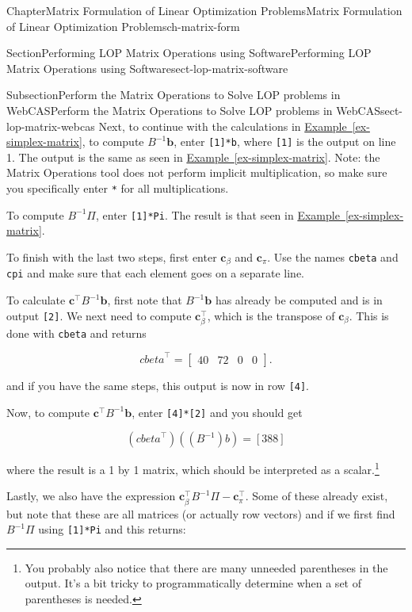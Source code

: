 \documentclass[oneside,10pt,]{book}
\newcommand{\xreffont}{\relax}
\newcommand{\mono}[1]{\texttt{#1}}
\numberwithin{equation}{section}
\newcommand{\amp}{&}
\begin{document}
\begin{chapterptx}{Chapter}{Matrix Formulation of Linear Optimization Problems}{}{Matrix Formulation of Linear Optimization Problems}{}{}{ch-matrix-form}
\begin{sectionptx}{Section}{Performing LOP Matrix Operations using Software}{}{Performing LOP Matrix Operations using Software}{}{}{sect-lop-matrix-software}
\begin{subsectionptx}{Subsection}{Perform the Matrix Operations to Solve LOP problems in WebCAS}{}{Perform the Matrix Operations to Solve LOP problems in WebCAS}{}{}{sect-lop-matrix-webcas}
Next, to continue with the calculations in \hyperref[ex-simplex-matrix]{Example~{\xreffont\ref{ex-simplex-matrix}}}, to compute \(B^{-1}\boldsymbol{b}\), enter \mono{[1]*b}, where \mono{[1]} is the output on line 1. The output is the same as seen in \hyperref[ex-simplex-matrix]{Example~{\xreffont\ref{ex-simplex-matrix}}}. Note: the Matrix Operations tool does not perform implicit multiplication, so make sure you specifically enter \mono{*} for all multiplications.%
\par
To compute \(B^{-1}\Pi\), enter \mono{[1]*Pi}. The result is that seen in \hyperref[ex-simplex-matrix]{Example~{\xreffont\ref{ex-simplex-matrix}}}.%
\par
To finish with the last two steps, first enter \(\boldsymbol{c}_{\beta}\) and \(\boldsymbol{c}_{\pi}\). Use the names \mono{cbeta} and \mono{cpi} and make sure that each element goes on a separate line.%
\par
To calculate \(\boldsymbol{c}^{\intercal}B^{-1}\boldsymbol{b}\), first note that \(B^{-1}\boldsymbol{b}\) has already be computed and is in output \mono{[2]}. We next need to compute \(\boldsymbol{c}_{\beta}^{\intercal}\), which is the transpose of \(\boldsymbol{c}_{\beta}\). This is done with \mono{cbeta\textquotesingle{}} and returns%
\par
%
\begin{equation*}
{cbeta}^{\intercal} = \left[\begin{array}{cccc} 40 \amp 72 \amp 0 \amp 0\end{array}\right].
\end{equation*}
%
\par
and if you have the same steps, this output is now in row \mono{[4]}.%
\par
Now, to compute  \(\boldsymbol{c}^{\intercal}B^{-1}\boldsymbol{b}\), enter \mono{[4]*[2]} and you should get%
\par
%
\begin{equation*}
({cbeta}^{\intercal})((B^{-1}) b) = [388]
\end{equation*}
%
\par
where the result is a 1 by 1 matrix, which should be interpreted as a scalar.\footnote{You probably also notice that there are many unneeded parentheses in the output. It's a bit tricky to programmatically determine when a set of parentheses is needed.\label{sect-lop-matrix-webcas-23-1}}%
\par
Lastly, we also have the expression \(\boldsymbol{c}_{\beta}^{\intercal}B^{-1}\Pi - \boldsymbol{c}_{\pi}^{\intercal}\). Some of these already exist, but note that these are all matrices (or actually row vectors) and if we first find \(B^{-1}\Pi\) using \mono{[1]*Pi} and this returns:%

\end{subsectionptx}
\end{sectionptx}
\end{chapterptx}
\end{document}
